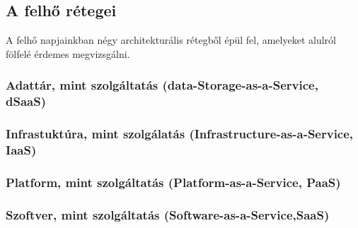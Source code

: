 \subsection{A felhő rétegei}
A felhő napjainkban négy architekturális rétegből épül fel, amelyeket alulról fölfelé érdemes megvizsgálni.
 
\subsubsection{Adattár, mint szolgáltatás (\foreignlanguage{english}{data-Storage-as-a-Service, dSaaS})}
\subsubsection{Infrastuktúra, mint szolgálatás (\foreignlanguage{english}{Infrastructure-as-a-Service, IaaS})}
\subsubsection{Platform, mint szolgáltatás (\foreignlanguage{english}{Platform-as-a-Service, PaaS})}
\subsubsection{Szoftver, mint szolgáltatás (\foreignlanguage{english}{Software-as-a-Service,SaaS})}
